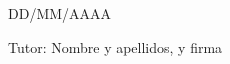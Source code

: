 \begin{center}
\vspace*{0.75cm}
\noindent \Large DD/MM/AAAA

\vspace*{1cm}
\noindent \large{Tutor: Nombre y apellidos, y firma\\}




\end{center}
\twocolumn
\newpage
